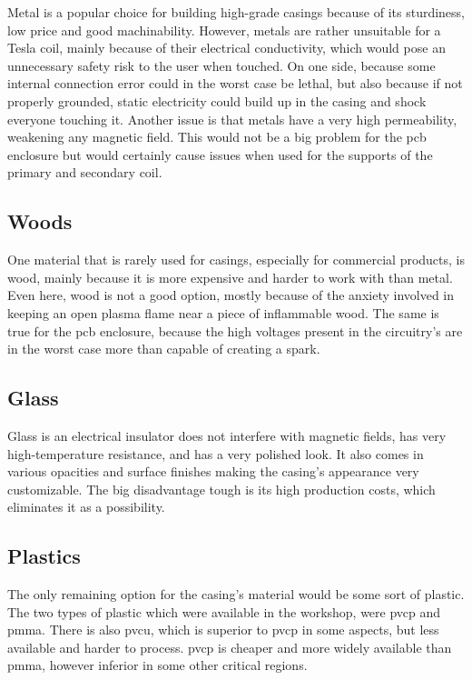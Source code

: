 Metal is a popular choice for building high-grade casings because of its sturdiness, low price and good machinability. However, metals are rather unsuitable for a Tesla coil, mainly because of their electrical conductivity, which would pose an unnecessary safety risk to the user when touched. On one side, because some internal connection error could in the worst case be lethal, but also because if not properly grounded, static electricity could build up in the casing and shock everyone touching it. Another issue is that metals have a very high permeability, weakening any magnetic field. This would not be a big problem for the \gls{pcb} enclosure but would certainly cause issues when used for the supports of the primary and secondary coil.

\subsection{Woods}

One material that is rarely used for casings, especially for commercial products, is wood, mainly because it is more expensive and harder to work with than metal. Even here, wood is not a good option, mostly because of the anxiety involved in keeping an open plasma flame near a piece of inflammable wood. The same is true for the \gls{pcb} enclosure, because the high voltages present in the circuitry's are in the worst case more than capable of creating a spark.

\subsection{Glass}

Glass is an electrical insulator does not interfere with magnetic fields, has very high-temperature resistance, and has a very polished look. It also comes in various opacities and surface finishes making the casing's appearance very customizable. The big disadvantage tough is its high production costs, which  eliminates it as a possibility.

\subsection{Plastics}

The only remaining option for the casing's material would be some sort of plastic. The two types of plastic which were available in the workshop, were \gls{pvcp} and \gls{pmma}. There is also \gls{pvcu}, which is superior to \gls{pvcp} in some aspects, but less available and harder to process. \gls{pvcp} is cheaper and more widely available than \gls{pmma}, however inferior in some other critical regions.


